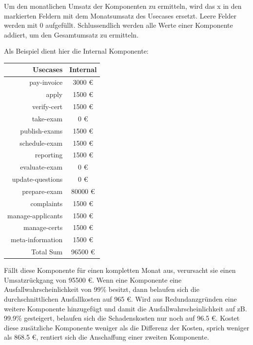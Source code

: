 Um den monatlichen Umsatz der Komponenten zu ermitteln, wird das x in den markierten Feldern mit dem Monatsumsatz des Usecases ersetzt. Leere Felder werden mit 0 aufgefüllt. Schlussendlich werden alle Werte einer Komponente addiert, um den Gesamtumsatz zu ermitteln.

Als Beispiel dient hier die Internal Komponente:

\hfill \break

\begin{tabular}{ | r | c | }
    \hline
    Usecases & Internal \\
    \hline
    pay-invoice & 3000 \euro \\
    \hline
    apply & 1500 \euro \\
    \hline
    verify-cert & 1500 \euro \\
    \hline
    take-exam & 0 \euro \\
    \hline
    publish-exams & 1500 \euro \\
    \hline
    schedule-exam & 1500 \euro \\
    \hline
    reporting & 1500 \euro \\
    \hline
    evaluate-exam & 0 \euro \\
    \hline
    update-questions & 0 \euro \\
    \hline
    prepare-exam & 80000 \euro \\
    \hline
    complaints & 1500 \euro \\
    \hline
    manage-applicants & 1500 \euro \\
    \hline
    manage-certs & 1500 \euro \\
    \hline
    meta-information & 1500 \euro \\
    \hline
    Total Sum & 96500 \euro \\
    \hline
\end{tabular}

\hfill \break

Fällt diese Komponente für einen kompletten Monat aus, verursacht sie einen Umsatzrückgang von 95500 \euro. Wenn eine Komponente eine Ausfallwahrscheinlichkeit von 99\% besitzt, dann belaufen sich die durchschnittlichen Ausfallkosten auf 965 \euro. Wird aus Redundanzgründen eine weitere Komponente hinzugefügt und damit die Ausfallwahrscheinlichkeit auf zB. 99.9\% gesteigert, belaufen sich die Schadenskosten nur noch auf 96.5 \euro. Kostet diese zusätzliche Komponente weniger als die Differenz der Kosten, sprich weniger als 868.5 \euro, rentiert sich die Anschaffung einer zweiten Komponente.

